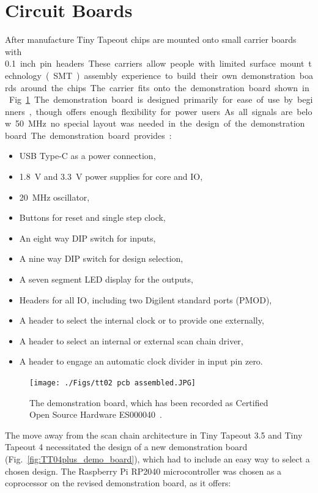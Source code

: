 \section{Circuit Boards}
\label{sec:circuit_board}
After manufacture Tiny Tapeout chips are mounted onto small carrier boards with \qty{0.1}~inch pin headers. These carriers allow people with limited surface mount technology (SMT) assembly experience to build their own demonstration boards around the chips.

The carrier fits onto the demonstration board shown in Fig.~\ref{fig:demonstration_board}. The demonstration board is designed primarily for ease of use by beginners, though offers enough flexibility for power users. As all signals are below \qty{50}{\MHz} no special layout was needed in the design of the demonstration board.

The demonstration board provides:
\begin{itemize}
\item USB Type-C as a power connection,
\item \qty{1.8}{\V} and \qty{3.3}{\V} power supplies for core and IO,
\item \qty{20}{\MHz} oscillator,
\item Buttons for reset and single step clock,
\item An eight way DIP switch for inputs,
\item A nine way DIP switch for design selection,
\item A seven segment LED display for the outputs,
\item Headers for all IO, including two Digilent standard ports (PMOD),
\item A header to select the internal clock or to provide one externally,
\item A header to select an internal or external scan chain driver,
\item A header to engage an automatic clock divider in input pin zero.
\end{itemize}

\begin{figure}[!t]
\centering
\texttt{[image: ./Figs/tt02 pcb assembled.JPG]}
\caption{The demonstration board, which has been recorded as Certified Open Source Hardware ES000040~\cite{oshwacertification}.}
\label{fig:demonstration_board}
\end{figure}

The move away from the scan chain architecture in Tiny Tapeout 3.5 and Tiny Tapeout 4 necessitated the design of a new demonstration board (Fig.~\ref{fig:TT04plus_demo_board}), which had to include an easy way to select a chosen design.
The Raspberry Pi RP2040 microcontroller was chosen as a coprocessor on the revised demonstration board, as it offers:

